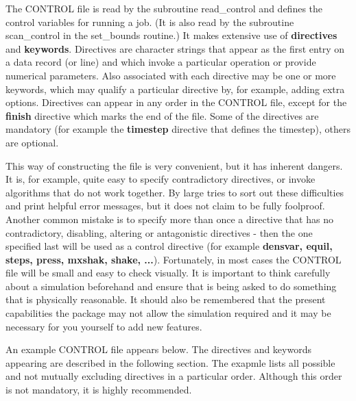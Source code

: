 The CONTROL file is read by the subroutine {\sc read\_control} and
defines the control variables for running a \D job.  (It is also
read by the subroutine {\sc scan\_control} in the {\sc
set\_bounds} routine.)  It makes extensive use of {\bf directives}
and {\bf keywords}.  Directives are character strings that appear
as the first entry on a data record (or line) and which invoke a
particular operation or provide numerical parameters.  Also
associated with each directive may be one or more keywords, which
may qualify a particular directive by, for example, adding extra
options.  Directives can appear in any order in the CONTROL file,
except for the {\bf finish} directive which marks the end of the
file.  Some of the directives are mandatory (for example the {\bf
timestep} directive that defines the timestep), others are
optional.

This way of constructing the file is very convenient, but it has
inherent dangers.  It is, for example, quite easy to specify
contradictory directives, or invoke algorithms
that do not work together.  By large \D tries to sort out these
difficulties and print helpful error messages, but it does not
claim to be fully foolproof.  Another common mistake is to specify
more than once a directive that has no contradictory, disabling,
altering or antagonistic directives - then the one specified
last will be used as a control directive (for example
{\bf densvar, equil, steps, press, mxshak, shake, ...}).
Fortunately, in most cases the CONTROL file will be small and
easy to check visually.  It is important to think carefully about
a simulation beforehand and ensure that \D is being asked to do
something that is physically reasonable.  It should also be
remembered that the present capabilities the package may not
allow the simulation required and it may be necessary for you
yourself to add new features.

An example CONTROL file appears below.  The directives and
keywords appearing are described in the following section.  The
exapmle lists all possible and not mutually excluding directives
in a particular order.  Although this order is not mandatory, it
is highly recommended.

